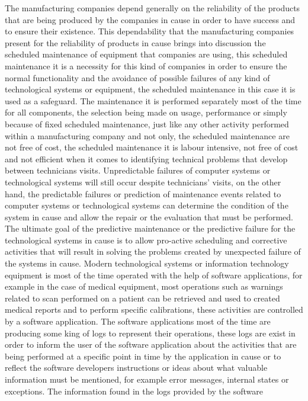 The manufacturing companies depend generally on the reliability of the products that are being produced by the
companies in cause in order to have success and to ensure their existence. This dependability that the manufacturing
companies present for the reliability of products in cause brings into discussion the scheduled maintenance of
equipment that companies are using, this scheduled maintenance it is a necessity for this kind of companies in
order to ensure the normal functionality and the avoidance of possible failures of any kind of technological
systems or equipment, the scheduled maintenance in this case it is used as a safeguard. The maintenance it is
performed separately most of the time for all components, the selection being made on usage, performance or
simply because of fixed scheduled maintenance, just like any other activity performed within a manufacturing
company and not only, the scheduled maintenance are not free of cost, the scheduled maintenance it is labour
intensive, not free of cost and not efficient when it comes to identifying technical problems that develop
between technicians visits. Unpredictable failures of computer systems or technological systems will still
occur despite technicians’ visits, on the other hand, the predictable failures or prediction of maintenance
events related to computer systems or technological systems can determine the condition of the system in cause
and allow the repair or the evaluation that must be performed. The ultimate goal of the predictive maintenance
or the predictive failure for the technological systems in cause is to allow pro-active scheduling and corrective
activities that will result in solving the problems created by unexpected failure of the systems in cause. Modern
technological systems or information technology equipment is most of the time operated with the help of software
applications, for example in the case of medical equipment, most operations such as warnings related to scan
performed on a patient can be retrieved and used to created medical reports and to perform specific calibrations,
these activities are controlled by a software application. The software applications most of the time are producing
some king of logs to represent their operations, these logs are exist in order to inform the user of the software
application about the activities that are being performed at a specific point in time by the application in cause
or to reflect the software developers instructions or ideas about what valuable information must be mentioned, for
example error messages, internal states or exceptions. The information found in the logs provided by the software
